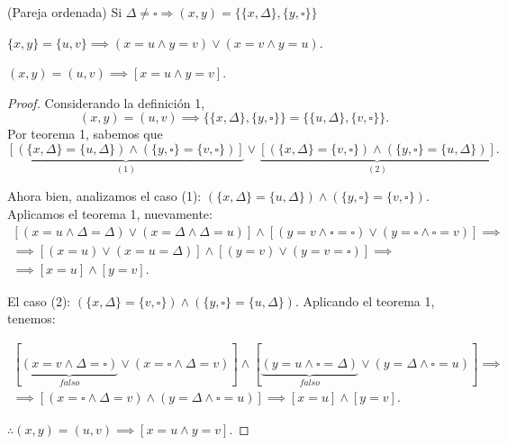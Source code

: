 






\begin{cajita}
	\begin{definicion}(Pareja ordenada)
		Si $\Delta \neq \square \Rightarrow(x, y)=\{\{x, \Delta\},\{y, \square\}\}$
	\end{definicion}
\end{cajita}

\begin{cajita}
	\begin{teorema}
		$\{x,y\}=\{u,v\}\implies (x=u\wedge y=v)\vee (x=v\wedge y=u)$. 
	\end{teorema}
\end{cajita}

\begin{problema}
	$(x,y)=(u,v)\implies [x=u\wedge y=v]$. 
\end{problema}
\begin{proof}
	Considerando la definición 1, $$(x,y)=(u,v)\implies \{\{x,\Delta\},\{y,\square\}\} =\{\{u,\Delta\},\{v,\square\}\}.$$
	Por teorema 1, sabemos que $$\underbrace{\left[\left(\{x,\Delta\}=\{u,\Delta\}\right)\wedge \left(\{y,\square\}=\{v,\square\}\right)\right]}_{(1)}\vee \underbrace{\left[\left(\{x,\Delta\}=\{v,\square\}\right)\wedge\left( \{y,\square\}=\{u,\Delta\}\right)\right]}_{(2)}.$$
	
	Ahora bien, analizamos el caso (1): $\left(\{x,\Delta\}=\{u,\Delta\}\right)\wedge \left(\{y,\square\}=\{v,\square\}\right)$. Aplicamos el teorema 1, nuevamente: 
	\begin{gather*}
		\left[(x=u\wedge \Delta=\Delta)\vee (x=\Delta \wedge \Delta=u)\right]\wedge\left[(y=v\wedge \square=\square)\vee (y=\square\wedge \square=v)\right] \implies\\
		\implies [(x=u)\vee (x=u=\Delta)]\wedge [(y=v)\vee (y=v=\square)] \implies \\
		\implies [x=u]\wedge [y=v]. 
	\end{gather*}

	
	El caso (2): $\left(\{x,\Delta\}=\{v,\square\}\right)\wedge\left( \{y,\square\}=\{u,\Delta\}\right)$. Aplicando el teorema 1, tenemos: 
	
	\begin{gather*}
		\left[\underbrace{(x=v\wedge \Delta=\square)}_{falso}\vee (x=\square \wedge \Delta=v)\right]\wedge\left[\underbrace{(y=u\wedge \square=\Delta)}_{falso}\vee (y=\Delta\wedge \square=u)\right]\implies\\ 
		\implies [(x=\square \wedge \Delta=v)\wedge (y=\Delta\wedge \square=u)]\implies [x=u]\wedge [y=v].
	\end{gather*}

$\therefore (x,y)=(u,v)\implies [x=u\wedge y=v]$. 

	
\end{proof}




